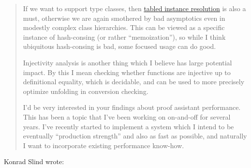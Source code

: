 \begin{subappendices}
\begin{quotation}
If we want to support type classes, then \href{https://arxiv.org/pdf/2001.04301.pdf}{tabled instance resolution} \textcite{Tabled2020Selsam} is also a must, otherwise we are again smothered by bad asymptotics even in modestly complex class hierarchies. This can be viewed as a specific instance of hash-consing (or rather ``memoization''), so while I think ubiquitous hash-consing is bad, some focused usage can do good.

Injectivity analysis is another thing which I believe has large potential impact. By this I mean checking whether functions are injective up to definitional equality, which is decidable, and can be used to more precisely optimize unfolding in conversion checking.

I'd be very interested in your findings about proof assistant performance. This has been a topic that I've been working on on-and-off for several years. I've recently started to implement a system which I intend to be eventually ``production strength'' and also as fast as possible, and naturally I want to incorporate existing performance know-how.
\end{quotation}
Konrad Slind wrote:


\begin{comment}
\section{Transcript bits from talking with Adam}
And my phone is now recording.

Yeah, so my son's this story is that the there'll be sort of introduction and at some point I'll have to introduce caulk and some amount of detail and I'm not sure where exactly that bit of it goes. But the main thing I want to talk about in the introduction is.


\end{comment}
\end{subappendices}
